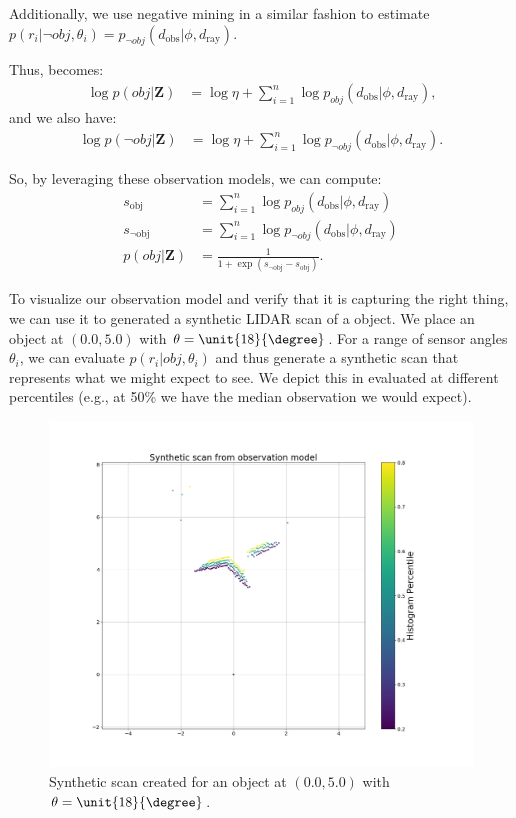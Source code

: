 Additionally, we use negative mining in a similar fashion to estimate
$p( r_i | \lnot obj, \theta_i) = p_{\lnot obj} ( d_{\text{obs}} | \phi, d_{\text{ray}}) $.

Thus,  becomes:
%
\begin{align}
  \log p( obj | \mathbf{Z} ) &=
   \log{\eta} + \sum_{i=1}^{n} { \log p_{obj}( d_{\text{obs}} | \phi, d_{\text{ray}}) }
   \text{,}
   \label{eq:obj_model_pos}
\end{align}
%
and we also have:
%
\begin{align}
  \log p( \lnot obj | \mathbf{Z} ) &=
   \log{\eta} + \sum_{i=1}^{n} { \log p_{\lnot obj} ( d_{\text{obs}} | \phi, d_{\text{ray}}) }
   \text{.}
   \label{eq:obj_model_neg}
\end{align}

So, by leveraging these observation models, we can compute:
%
\begin{align}
  s_{ \text{obj} }     &=
    \sum_{i=1}^{n} { \log p_{obj}( d_{\text{obs}} | \phi, d_{\text{ray}}) } \\
  s_{\lnot \text{obj}} &=
    \sum_{i=1}^{n} { \log p_{\lnot obj} ( d_{\text{obs}} | \phi, d_{\text{ray}}) } \\
  p ( obj | \mathbf{Z} ) &=
    \frac{1}{1 + \exp{(s_{\lnot \text{obj}} - s_{\text{obj}})}}
  \text{.}
  \label{eq:detection_prob}
\end{align}

To visualize our observation model and verify that it is capturing the right
thing, we can use it to generated a synthetic LIDAR scan of a object. We place
an object at $(0.0, 5.0)$ with $\theta = \unit{18}{\degree}$. For a range of
sensor angles $\theta_i$, we can evaluate $p( r_i | obj, \theta_i ) $ and thus
generate a synthetic scan that represents what we might expect to see. We depict
this in  evaluated at different percentiles (e.g., at
50\% we have the median observation we would expect).
%
\begin{figure}
  \centering
  \includegraphics[width=\columnwidth]{figures/synthetic_scan.png}
  \caption{Synthetic scan created for an object at $(0.0, 5.0)$ with $\theta =
    \unit{18}{\degree}$.}
  \label{fig:synthetic_scan}
\end{figure}
